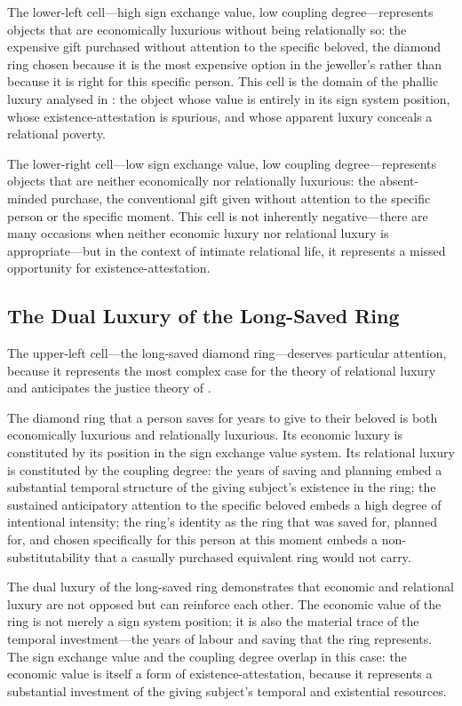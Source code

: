 The lower-left cell---high sign exchange value, low coupling degree---represents objects that are economically luxurious without being relationally so: the expensive gift purchased without attention to the specific beloved, the diamond ring chosen because it is the most expensive option in the jeweller's rather than because it is right for this specific person. This cell is the domain of the phallic luxury analysed in : the object whose value is entirely in its sign system position, whose existence-attestation is spurious, and whose apparent luxury conceals a relational poverty.

The lower-right cell---low sign exchange value, low coupling degree---represents objects that are neither economically nor relationally luxurious: the absent-minded purchase, the conventional gift given without attention to the specific person or the specific moment. This cell is not inherently negative---there are many occasions when neither economic luxury nor relational luxury is appropriate---but in the context of intimate relational life, it represents a missed opportunity for existence-attestation.

\subsection{The Dual Luxury of the Long-Saved Ring}
\label{p16:subsec:dual_luxury}

\noindent
The upper-left cell---the long-saved diamond ring---deserves particular attention, because it represents the most complex case for the theory of relational luxury and anticipates the justice theory of .

The diamond ring that a person saves for years to give to their beloved is both economically luxurious and relationally luxurious. Its economic luxury is constituted by its position in the sign exchange value system. Its relational luxury is constituted by the coupling degree: the years of saving and planning embed a substantial temporal structure of the giving subject's existence in the ring; the sustained anticipatory attention to the specific beloved embeds a high degree of intentional intensity; the ring's identity as the ring that was saved for, planned for, and chosen specifically for this person at this moment embeds a non-substitutability that a casually purchased equivalent ring would not carry.

The dual luxury of the long-saved ring demonstrates that economic and relational luxury are not opposed but can reinforce each other. The economic value of the ring is not merely a sign system position; it is also the material trace of the temporal investment---the years of labour and saving that the ring represents. The sign exchange value and the coupling degree overlap in this case: the economic value is itself a form of existence-attestation, because it represents a substantial investment of the giving subject's temporal and existential resources.

